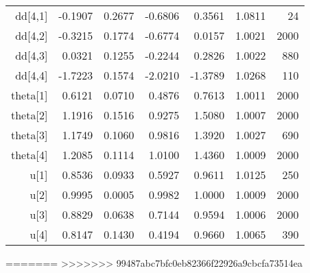 \begin{table}[ht]
\begin{tabular}{rrrrrrr}
  dd[4,1] & -0.1907 & 0.2677 & -0.6806 & 0.3561 & 1.0811 &    24 \\ 
  dd[4,2] & -0.3215 & 0.1774 & -0.6774 & 0.0157 & 1.0021 &  2000 \\ 
  dd[4,3] & 0.0321 & 0.1255 & -0.2244 & 0.2826 & 1.0022 &   880 \\ 
  dd[4,4] & -1.7223 & 0.1574 & -2.0210 & -1.3789 & 1.0268 &   110 \\ 
  theta[1] & 0.6121 & 0.0710 & 0.4876 & 0.7613 & 1.0011 &  2000 \\ 
  theta[2] & 1.1916 & 0.1516 & 0.9275 & 1.5080 & 1.0007 &  2000 \\ 
  theta[3] & 1.1749 & 0.1060 & 0.9816 & 1.3920 & 1.0027 &   690 \\ 
  theta[4] & 1.2085 & 0.1114 & 1.0100 & 1.4360 & 1.0009 &  2000 \\ 
  u[1] & 0.8536 & 0.0933 & 0.5927 & 0.9611 & 1.0125 &   250 \\ 
  u[2] & 0.9995 & 0.0005 & 0.9982 & 1.0000 & 1.0009 &  2000 \\ 
  u[3] & 0.8829 & 0.0638 & 0.7144 & 0.9594 & 1.0006 &  2000 \\ 
  u[4] & 0.8147 & 0.1430 & 0.4194 & 0.9660 & 1.0065 &   390 \\ 
   \hline
\end{tabular}
\end{table}
=======
>>>>>>> 99487abc7bfc0eb82366f22926a9cbcfa73514ea
